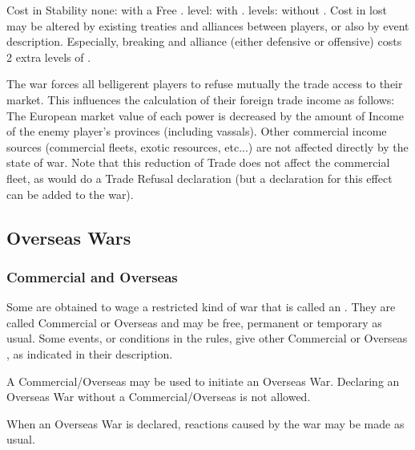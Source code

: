 \aparag Cost in Stability
\bparag none: with a Free \CB.
 level: with \CB.
 levels: without \CB.
\bparag[Note]
Cost in lost \STAB may be altered by existing treaties and alliances between
players, or also by event description. Especially, breaking and alliance
(either defensive or offensive) costs 2 extra levels of \STAB.

The war forces all belligerent players to refuse mutually the trade access to
their market. This influences the calculation of their foreign trade income as
follows:
\bparag The European market value of each power is decreased by the amount of
Income of the enemy player's provinces (including vassals).
\bparag Other commercial income sources (commercial fleets, exotic resources,
etc...) are not affected directly by the state of war.
\bparag Note that this reduction of Trade does not affect the commercial
fleet, as would do a Trade Refusal declaration (but a declaration for this
effect can be added to the war).



\subsection{Overseas Wars}\label{chDiplo:Overseas Wars}


\subsubsection{Commercial and Overseas \CB}
\aparag Some \CB are obtained to wage a restricted kind of war that is called
an . They are called Commercial \CB or Overseas \CB and
may be free, permanent or temporary as usual. Some events, or conditions in
the rules, give other Commercial or Overseas \CB, as indicated in their
description.  \overseascb

\aparag A Commercial/Overseas \CB may be used to initiate an Overseas
War. Declaring an Overseas War without a Commercial/Overseas \CB is not
allowed.

\aparag When an Overseas War is declared, reactions caused by the war may be
made as usual.


